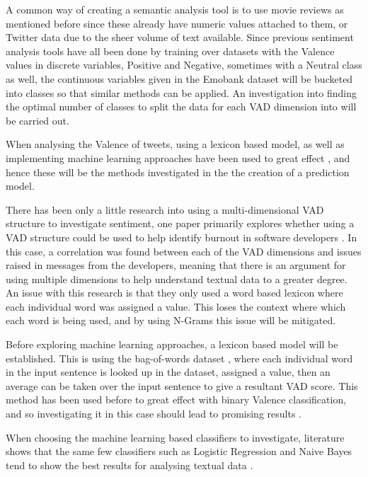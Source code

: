 A common way of creating a semantic analysis tool is to use movie reviews as mentioned before since these already have numeric values attached to them, or Twitter data due to the sheer volume of text available. Since previous sentiment analysis tools have all been done by training over datasets with the Valence values in discrete variables, Positive and Negative, sometimes with a Neutral class as well, the continuous variables given in the Emobank dataset will be bucketed into classes so that similar methods can be applied. An investigation into finding the optimal number of classes to split the data for each VAD dimension into will be carried out.

When analysing the Valence of tweets, using a lexicon based model, as well as implementing machine learning approaches have been used to great effect \cite{kolchyna2015twitter}, and hence these will be the methods investigated in the the creation of a prediction model.

There has been only a little research into using a multi-dimensional VAD structure to investigate sentiment, one paper primarily explores whether using a VAD structure could be used to help identify burnout in software developers \cite{mantyla2016mining}. In this case, a correlation was found between each of the VAD dimensions and issues raised in messages from the developers, meaning that there is an argument for using multiple dimensions to help understand textual data to a greater degree. An issue with this research is that they only used a word based lexicon where each individual word was assigned a value. This loses the context where which each word is being used, and by using N-Grams this issue will be mitigated.

Before exploring machine learning approaches, a lexicon based model will be established. This is using the bag-of-words dataset \cite{wordsData}, where each individual word in the input sentence is looked up in the dataset, assigned a value, then an average can be taken over the input sentence to give a resultant VAD score. This method has been used before to great effect with binary Valence classification, and so investigating it in this case should lead to promising results \cite{kolchyna2015twitter}.

When choosing the machine learning based classifiers to investigate, literature shows that the same few classifiers such as Logistic Regression and Naive Bayes tend to show the best results for analysing textual data \cite{kolchyna2015twitter} \cite{frank2006naive}.

